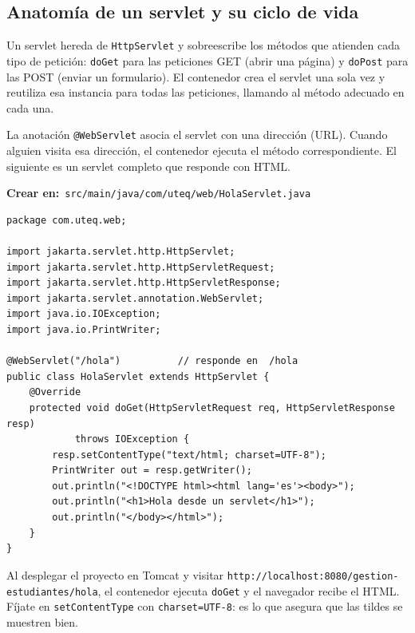 \documentclass[11pt]{article}
\begin{document}
\subsection{Anatomía de un servlet y su ciclo de vida}
Un servlet hereda de \texttt{Http\allowbreak{}Servlet} y sobreescribe los métodos que atienden cada tipo de petición: \texttt{do\allowbreak{}Get} para las peticiones GET (abrir una página) y \texttt{do\allowbreak{}Post} para las POST (enviar un formulario). El contenedor crea el servlet una sola vez y reutiliza esa instancia para todas las peticiones, llamando al método adecuado en cada una.

La anotación \texttt{@Web\allowbreak{}Servlet} asocia el servlet con una dirección (URL). Cuando alguien visita esa dirección, el contenedor ejecuta el método correspondiente. El siguiente es un servlet completo que responde con HTML.

{\small\color{jwebazulo}\textbf{Crear en:}~}\texttt{src/\allowbreak{}main/\allowbreak{}java/\allowbreak{}com/\allowbreak{}uteq/\allowbreak{}web/\allowbreak{}Hola\allowbreak{}Servlet.\allowbreak{}java}\par\nobreak\vspace{-1pt}
\begin{cajacodigo}
\begin{lstlisting}[style=java]
package com.uteq.web;

import jakarta.servlet.http.HttpServlet;
import jakarta.servlet.http.HttpServletRequest;
import jakarta.servlet.http.HttpServletResponse;
import jakarta.servlet.annotation.WebServlet;
import java.io.IOException;
import java.io.PrintWriter;

@WebServlet("/hola")          // responde en  /hola
public class HolaServlet extends HttpServlet {
    @Override
    protected void doGet(HttpServletRequest req, HttpServletResponse resp)
            throws IOException {
        resp.setContentType("text/html; charset=UTF-8");
        PrintWriter out = resp.getWriter();
        out.println("<!DOCTYPE html><html lang='es'><body>");
        out.println("<h1>Hola desde un servlet</h1>");
        out.println("</body></html>");
    }
}
\end{lstlisting}
\end{cajacodigo}
\vspace{2pt}
Al desplegar el proyecto en Tomcat y visitar \texttt{http:\allowbreak{}/\allowbreak{}/\allowbreak{}localhost:\allowbreak{}8080/\allowbreak{}gestion-estudiantes/\allowbreak{}hola}, el contenedor ejecuta \texttt{do\allowbreak{}Get} y el navegador recibe el HTML. Fíjate en \texttt{set\allowbreak{}Content\allowbreak{}Type} con \texttt{charset=\allowbreak{}UTF-8}: es lo que asegura que las tildes se muestren bien.
\end{document}
